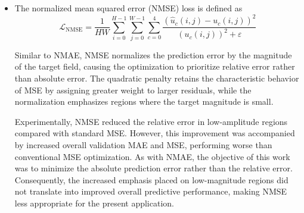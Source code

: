 \documentclass[preprint,review,12pt,numafflabel]{elsarticle}
\begin{document}
\begin{itemize}
Experimentally, NMAE successfully reduced the relative error in low-amplitude portions of the solution. However, this improvement came at the expense of increased overall MAE and MSE compared with training using the standard MAE loss. For the present application, the absolute magnitude of the prediction error was determined to be of greater practical importance than the relative error. As a result, the improved accuracy in low-valued regions did not outweigh the degradation in overall numerical accuracy, making NMAE a less suitable optimization criterion for the objectives of this work. In other applications, however, NMAE can be a valid and sometimes preferable alternative to standard MAE.

\item The normalized mean squared error (NMSE) loss is defined as
\begin{equation*}
    \mathcal{L}_{\text{NMSE}} = \frac{1}{HW} \sum_{i=0}^{H-1} \sum_{j=0}^{W-1} \sum_{c=0}^{4} \frac{\displaystyle \left(\hat{u}_{c}(i,j) - u_{c}(i,j) \right)^2}{\left( u_{c}(i,j) \right)^2 + \varepsilon}
\end{equation*}

Similar to NMAE, NMSE normalizes the prediction error by the magnitude of the target field, causing the optimization to prioritize relative error rather than absolute error. The quadratic penalty retains the characteristic behavior of MSE by assigning greater weight to larger residuals, while the normalization emphasizes regions where the target magnitude is small.

Experimentally, NMSE reduced the relative error in low-amplitude regions compared with standard MSE. However, this improvement was accompanied by increased overall validation MAE and MSE, performing worse than conventional MSE optimization. As with NMAE, the objective of this work was to minimize the absolute prediction error rather than the relative error. Consequently, the increased emphasis placed on low-magnitude regions did not translate into improved overall predictive performance, making NMSE less appropriate for the present application.
\end{itemize}
\end{document}
